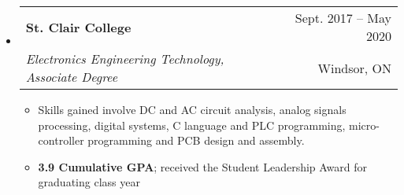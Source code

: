 \documentclass[letterpaper,11pt]{article}
\makeatletter
\newcommand{\resumeItem}[1]{
  \item\small{
    {#1 \vspace{-1pt}}
  }
}
\newcommand{\resumeSubheading}[4]{
  \vspace{-1pt}\item
    \begin{tabular*}{\textwidth}[t]{l@{\extracolsep{\fill}}r}
      \textbf{#1} & {\color{dark-grey}\small #2}\vspace{1pt}\\ %
      \textit{#3} & {\color{dark-grey} \small #4}\\ %
    \end{tabular*}\vspace{-4pt}
}
\newcommand{\resumeSubHeadingListStart}{\begin{itemize}[leftmargin=0in, label={}]}
\newcommand{\resumeSubHeadingListEnd}{\end{itemize}}
\newcommand{\resumeItemListStart}{\begin{itemize}}
\newcommand{\resumeItemListEnd}{\end{itemize}\vspace{0pt}}
\makeatother
\begin{document}
\resumeSubHeadingListStart
\resumeSubheading
{St. Clair College}{Sept. 2017 -- May 2020}
{Electronics Engineering Technology, Associate Degree}{Windsor, ON}
\resumeItemListStart
\resumeItem {Skills gained involve DC and AC circuit analysis, analog signals processing, digital systems, C language and PLC programming, micro-controller programming and PCB design and assembly.}
\resumeItem {\textbf{3.9 Cumulative GPA}; received the Student Leadership Award for graduating class year}
\resumeItemListEnd
\resumeSubHeadingListEnd


%


\end{document}
